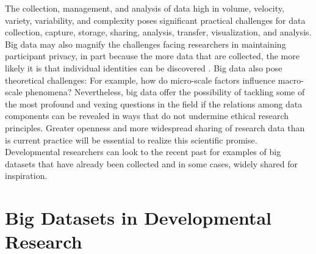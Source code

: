 \documentclass[letterpaper,man,apacite,natbib]{apa6}
\begin{document}
The collection, management, and analysis of data high in volume, velocity, variety, variability, and complexity poses significant practical challenges for data collection, capture, storage, sharing, analysis, transfer, visualization, and analysis.
Big data may also magnify the challenges facing researchers in maintaining participant privacy, in part because the more data that are collected, the more likely it is that individual identities can be discovered \cite{sweeney_identifiability}.
Big data also pose theoretical challenges: For example, how do micro-scale factors influence macro-scale phenomena?
Nevertheless, big data offer the possibility of tackling some of the most profound and vexing questions in the field if the relations among data components can be revealed in ways that do not undermine ethical research principles.
Greater openness and more widespread sharing of research data than is current practice will be essential to realize this scientific promise.
Developmental researchers can look to the recent past for examples of big datasets that have already been collected and in some cases, widely shared for inspiration.

\section{Big Datasets in Developmental Research}
\end{document}
